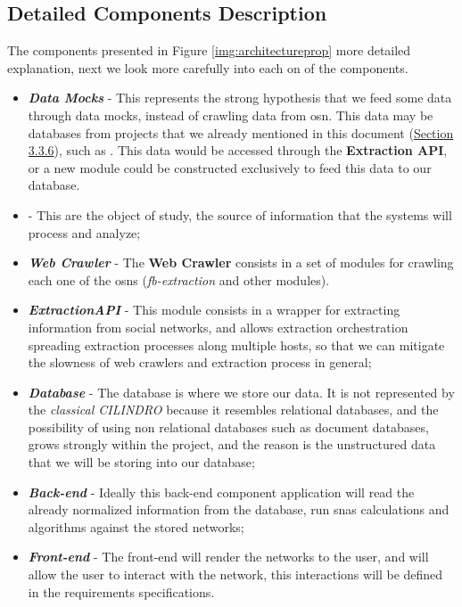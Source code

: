 \subsection{Detailed Components Description}
The components presented in Figure \ref{img:architectureprop} more detailed explanation, next we look more carefully into each on of the components.
\begin{itemize}
    \item \textbf{\textit{Data Mocks}} - This represents the strong hypothesis that we feed some data through data mocks, instead of crawling data from \gls{osn}. This data may be databases from projects that we already mentioned in this document  (\hyperref[sec:otherdatasources]{Section 3.3.6}), such as \cite{kunegis2013konect}. This data would be accessed through the \textbf{Extraction API}, or a new module could be constructed exclusively to feed this data to our database.
    \item \textbf{\textit{}} - This are the object of study, the source of information that the systems will process and analyze;
    \item \textbf{\textit{Web Crawler}} - The \textbf{Web Crawler} consists in a set of modules for crawling each one of the \glspl{osn} (\textit{fb-extraction} and other modules).
    \item \textbf{\textit{ExtractionAPI}} - This module consists in a wrapper for extracting information from social networks, and allows extraction orchestration spreading extraction processes along multiple hosts, so that we can mitigate the slowness of web crawlers and extraction process in general;
    \item \textbf{\textit{Database}} - The database is where we store our data. It is not represented by the \textit{classical CILINDRO} because it resembles relational databases, and the possibility of using non relational databases such as document databases, grows strongly within the project, and the reason is the unstructured data that we will be storing into our database;
    \item \textbf{\textit{Back-end}} - Ideally this back-end component application will read the already normalized information from the database, run \glspl{sna} calculations and algorithms against the stored networks;
    \item \textbf{\textit{Front-end}} - The front-end will render the networks to the user, and will allow the user to interact with the network, this interactions will be defined in the requirements specifications.
\end{itemize}
